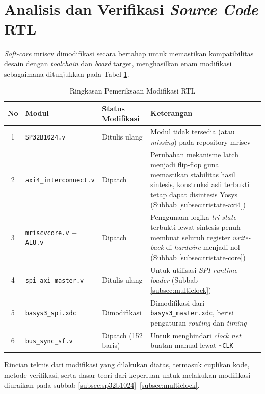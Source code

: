 \section{Analisis dan Verifikasi \textit{Source Code} RTL}
\label{sec:verifikasi-rtl}

\textit{Soft-core} mriscv dimodifikasi secara bertahap untuk memastikan kompatibilitas desain dengan \textit{toolchain} dan \textit{board} target, menghasilkan enam modifikasi sebagaimana ditunjukkan pada Tabel \ref{Tab: Pemeriksaan Modifikasi RTL}.

\begin{table}[H]
	\centering
	\small
	\begin{tabular}{|c|p{4.4cm}|p{2.6cm}|p{5.2cm}|}
		\hline
		\textbf{No} & \textbf{Modul} & \textbf{Status Modifikasi} & \textbf{Keterangan} \\
		\hline
		1 & \texttt{SP32B1024.v} & Ditulis ulang &  Modul tidak tersedia (atau \textit{missing}) pada repository mriscv \\ \hline
		2 & \texttt{axi4\_\-inter\-connect.v} & Dipatch & Perubahan mekanisme latch menjadi flip-flop guna memastikan stabilitas hasil sintesis, konstruksi asli terbukti tetap dapat disintesis Yosys (Subbab \ref{subsec:tristate-axi4}) \\ \hline
		3 & \texttt{mriscvcore.v} + \texttt{ALU.v} & Dipatch & Penggunaan logika \textit{tri-state} terbukti lewat sintesis penuh membuat seluruh register \textit{write-back} di-\textit{hardwire} menjadi nol (Subbab \ref{subsec:tristate-core})  \\ \hline
		4 & \texttt{spi\_\-axi\_\-master.v} & Ditulis ulang &  Untuk utilisasi \textit{SPI runtime loader} (Subbab \ref{subsec:multiclock}) \\ \hline
		5 & \texttt{basys3\_\-spi.xdc} & Dimodifikasi & Dimodifikasi dari \texttt{basys3\_master.xdc}, berisi pengaturan \textit{routing} dan \textit{timing} \\ \hline
		6 & \texttt{bus\_\-sync\_\-sf.v} & Dipatch (152 baris) & Untuk menghindari \textit{clock net} buatan manual lewat \texttt{\textasciitilde CLK}\\ \hline
	\end{tabular}
	\normalsize
	\vspace{0.5em}
	\caption{Ringkasan Pemeriksaan Modifikasi RTL}
	\label{Tab: Pemeriksaan Modifikasi RTL}
\end{table}

Rincian teknis dari modifikasi yang dilakukan diatas, termasuk cuplikan kode, metode verifikasi, serta dasar teori dari keperluan untuk melakukan modifikasi diuraikan pada subbab \ref{subsec:sp32b1024}--\ref{subsec:multiclock}.

